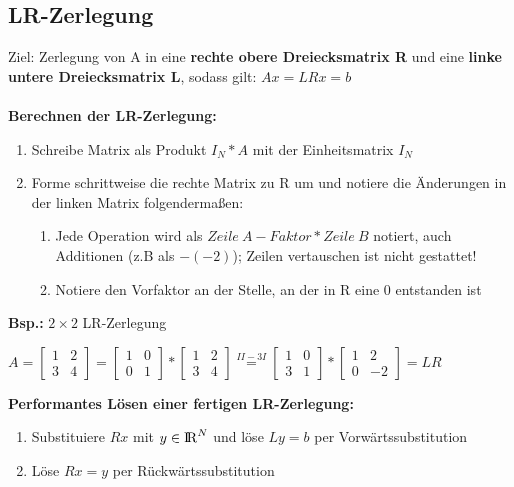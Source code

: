 \documentclass[10pt,a4paper]{article}
\def\realnumbers{{\rm I\!R}}
\newcommand{\rom}[1]{\uppercase\expandafter{\romannumeral #1\relax}}
\begin{document}
	\subsection{LR-Zerlegung}
	Ziel: Zerlegung von A in eine \textbf{rechte obere Dreiecksmatrix R} und eine \textbf{linke untere Dreiecksmatrix L}, sodass gilt: $Ax = LRx = b$\\\\
	\textbf{Berechnen der LR-Zerlegung:}
	\begin{enumerate}
		\item Schreibe Matrix als Produkt $I_N * A$ mit der Einheitsmatrix $I_N$
		\item Forme schrittweise die rechte Matrix zu R um und notiere die Änderungen in der linken Matrix folgendermaßen:
		\begin{enumerate}
			\item Jede Operation wird als $Zeile\ A - Faktor * Zeile\ B$ notiert, auch\\
			Additionen (z.B als \rom{2}$ - (-2)$\rom{1}); Zeilen vertauschen ist nicht gestattet!
			\item Notiere den Vorfaktor an der Stelle, an der in R eine 0 entstanden ist
		\end{enumerate}
	\end{enumerate}
	\textbf{Bsp.:} $2\times2$ LR-Zerlegung
	\begin{center}
		$A = 
		\begin{bmatrix}1 & 2 \\ 3 & 4\end{bmatrix} =
		\begin{bmatrix}1 & 0 \\ 0 & 1\end{bmatrix} * \begin{bmatrix}1 & 2 \\ 3 & 4\end{bmatrix} \stackrel{II - 3I}{=}
		\begin{bmatrix}1 & 0 \\ 3 & 1\end{bmatrix} * \begin{bmatrix}1 & 2 \\ 0 & -2\end{bmatrix} = LR
		$	
	\end{center}
	\textbf{Performantes Lösen einer fertigen LR-Zerlegung:}
	\begin{enumerate}
		\item Substituiere $Rx$ mit $y\in\realnumbers^N$ und löse $Ly = b$ per Vorwärtssubstitution
		\item Löse $Rx = y$ per Rückwärtssubstitution
	\end{enumerate}
\end{document}
